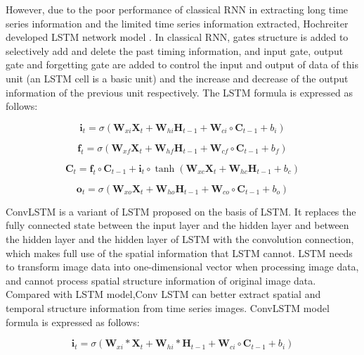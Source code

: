 \documentclass[../main]{subfiles}
\begin{document}
However, due to the poor performance of classical RNN in extracting long
time series information and the limited time series information
extracted, Hochreiter developed LSTM network model \cite{10.1162/neco.1997.9.8.1735}. In classical RNN, gates structure is added to selectively add
and delete the past timing information, and input gate, output gate and
forgetting gate are added to control the input and output of data of
this unit (an LSTM cell is a basic unit) and the increase and decrease
of the output information of the previous unit respectively. The LSTM
formula is expressed as follows:

\begin{equation}
\mathbf{i}_t=\sigma(\mathbf{W}_{xi}\mathbf{X}_{t}+\mathbf{W}_{hi}\mathbf{H}_{t-1}+\mathbf{W}_{ci}\circ\mathbf{C}_{t-1}+b_i)
\end{equation}

\begin{equation}
\mathbf{f}_t=\sigma(\mathbf{W}_{xf}\mathbf{X}_{t}+\mathbf{W}_{hf}\mathbf{H}_{t-1}+\mathbf{W}_{cf}\circ\mathbf{C}_{t-1}+b_f) 
\end{equation}

\begin{equation}
\mathbf{C}_t=\mathbf{f}_{t}\circ\mathbf{C}_{t-1}+\mathbf{i}_t\circ\tanh(\mathbf{W}_{xc}\mathbf{X}_{t}+\mathbf{W}_{hc}\mathbf{H}_{t-1}+b_c)
\end{equation}

\begin{equation}
\mathbf{o}_t=\sigma(\mathbf{W}_{xo}\mathbf{X}_{t}+\mathbf{W}_{ho}\mathbf{H}_{t-1}+\mathbf{W}_{co}\circ\mathbf{C}_{t-1}+b_o)
\end{equation}

ConvLSTM is a variant of LSTM proposed on the basis of LSTM. It replaces
the fully connected state between the input layer and the hidden layer
and between the hidden layer and the hidden layer of LSTM with the
convolution connection, which makes full use of the spatial information
that LSTM cannot. LSTM needs to transform image data into
one-dimensional vector when processing image data, and cannot process
spatial structure information of original image data. Compared with LSTM
model,Conv LSTM can better extract spatial and temporal structure
information from time series images. ConvLSTM model formula is expressed
as follows:

\begin{equation}
\mathbf{i}_t=\sigma(\mathbf{W}_{xi}*\mathbf{X}_{t}+\mathbf{W}_{hi}*\mathbf{H}_{t-1}+\mathbf{W}_{ci}\circ\mathbf{C}_{t-1}+b_i)
\end{equation}
\end{document}
